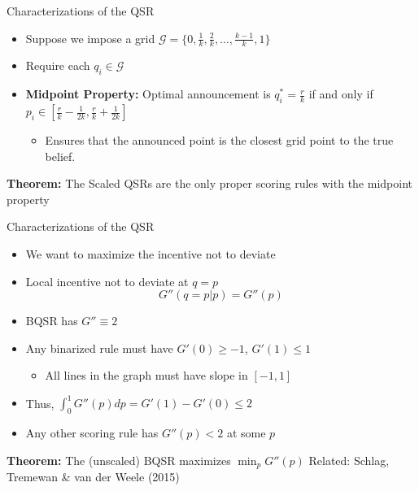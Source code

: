 \begin{frame}{Characterizations of the QSR}
\begin{itemize}
    \item Suppose we impose a grid $\mathcal{G}=\{0,\frac{1}{k},\frac{2}{k},\ldots,\frac{k-1}{k},1\}$
    \item Require each $q_i\in \mathcal{G}$
    \item \textbf{Midpoint Property:} Optimal announcement is $q_i^*=\frac{r}{k}$ if and only if $p_i\in [\frac{r}{k}-\frac{1}{2k},\frac{r}{k}+\frac{1}{2k}]$
    \begin{itemize}
        \item Ensures that the announced point is the closest grid point to the true belief.
    \end{itemize}
\end{itemize}
\br
\textbf{Theorem:} The Scaled QSRs are the only proper scoring rules with the midpoint property
    
\end{frame}

\begin{frame}{Characterizations of the QSR}
\begin{itemize}
    \item We want to maximize the incentive not to deviate
    \item Local incentive not to deviate at $q=p$
    $$
        G''(q=p|p) = G''(p)
    $$
    \item BQSR has $G''\equiv 2$
    \item Any binarized rule must have $G'(0)\geq -1$, $G'(1)\leq 1$
    \begin{itemize}
        \item All lines in the graph must have slope in $[-1,1]$
    \end{itemize}
    \item Thus, $\int_0^1 G''(p)dp = G'(1)-G'(0) \leq 2$
    \item Any other scoring rule has $G''(p)<2$ at some $p$
\end{itemize}
\br
\textbf{Theorem:} The (unscaled) BQSR maximizes $\min_p G''(p)$
\br
Related: Schlag, Tremewan \& van der Weele (2015)
\end{frame}

